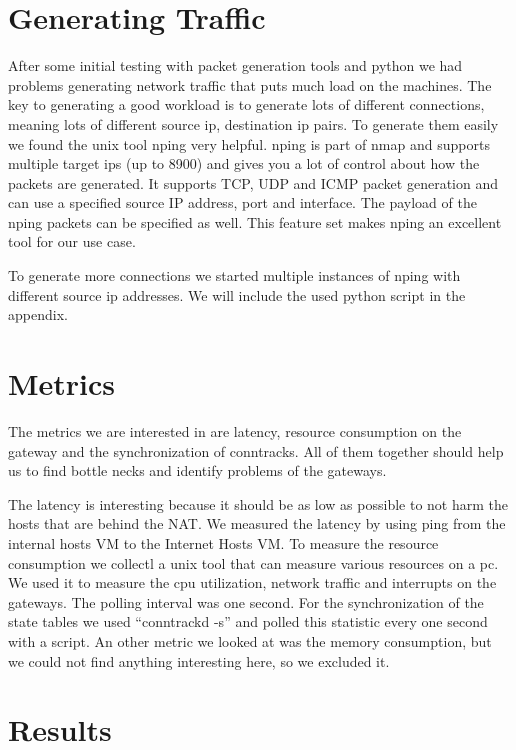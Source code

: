 \documentclass{report}
\begin{document}
\section{Generating Traffic}\label{generating-traffic}

After some initial testing with packet generation tools and python we
had problems generating network traffic that puts much load on the
machines. The key to generating a good workload is to generate lots of
different connections, meaning lots of different source ip, destination
ip pairs. To generate them easily we found the unix tool nping\cite{nping}
very helpful. nping is part of nmap\cite{nmap} and supports multiple target
ips (up to 8900) and gives you a lot of control about how the packets
are generated. It supports TCP, UDP and ICMP packet generation and can
use a specified source IP address, port and interface. The payload of
the nping packets can be specified as well. This feature set makes nping
an excellent tool for our use case.

To generate more connections we started multiple instances of nping with
different source ip addresses. We will include the used python script in
the appendix.



\section{Metrics}\label{metrics}

The metrics we are interested in are latency, resource consumption on
the gateway and the synchronization of conntracks. All of them together
should help us to find bottle necks and identify problems of the
gateways.

The latency is interesting because it should be as low as possible to
not harm the hosts that are behind the NAT. We measured the latency by
using ping\cite{ping} from the internal hosts VM to the Internet Hosts VM.
To measure the resource consumption we collectl\cite{collectl} a unix tool that
can measure various resources on a pc. We used it to measure the cpu
utilization, network traffic and interrupts on the gateways. The polling
interval was one second. For the synchronization of the state tables we
used ``conntrackd -s'' and polled this statistic every one second with a
script. An other metric we looked at was the memory consumption, but we
could not find anything interesting here, so we excluded it.

\section{Results}\label{results}
\end{document}
